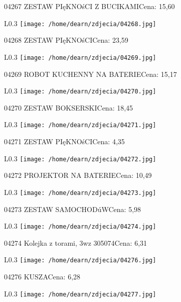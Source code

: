 04267 ZESTAW PIęKNOśCI Z BUCIKAMICena: 15,60\newline
\begin{wrapfigure}{L}{0.3\textwidth}
\texttt{[image: /home/dearn/zdjecia/04268.jpg]}
\end{wrapfigure}
04268 ZESTAW PIęKNOśCICena: 23,59\newline
\begin{wrapfigure}{L}{0.3\textwidth}
\texttt{[image: /home/dearn/zdjecia/04269.jpg]}
\end{wrapfigure}
04269 ROBOT KUCHENNY NA BATERIECena: 15,17\newline
\begin{wrapfigure}{L}{0.3\textwidth}
\texttt{[image: /home/dearn/zdjecia/04270.jpg]}
\end{wrapfigure}
04270 ZESTAW BOKSERSKICena: 18,45\newline
\begin{wrapfigure}{L}{0.3\textwidth}
\texttt{[image: /home/dearn/zdjecia/04271.jpg]}
\end{wrapfigure}
04271 ZESTAW PIęKNOśCICena: 4,35\newline
\begin{wrapfigure}{L}{0.3\textwidth}
\texttt{[image: /home/dearn/zdjecia/04272.jpg]}
\end{wrapfigure}
04272 PROJEKTOR NA BATERIECena: 10,49\newline
\begin{wrapfigure}{L}{0.3\textwidth}
\texttt{[image: /home/dearn/zdjecia/04273.jpg]}
\end{wrapfigure}
04273 ZESTAW SAMOCHODúWCena: 5,98\newline
\begin{wrapfigure}{L}{0.3\textwidth}
\texttt{[image: /home/dearn/zdjecia/04274.jpg]}
\end{wrapfigure}
04274 Kolejka z torami, 3wz  305074Cena: 6,31\newline
\begin{wrapfigure}{L}{0.3\textwidth}
\texttt{[image: /home/dearn/zdjecia/04276.jpg]}
\end{wrapfigure}
04276 KUSZACena: 6,28\newline
\begin{wrapfigure}{L}{0.3\textwidth}
\texttt{[image: /home/dearn/zdjecia/04277.jpg]}
\end{wrapfigure}
